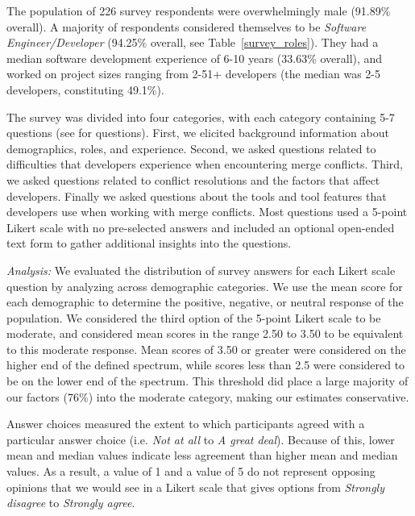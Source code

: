 The population of 226 survey respondents were overwhelmingly male (91.89\% overall). A majority of respondents considered themselves to be \textit{Software Engineer/Developer} (94.25\% overall, see Table~\ref{survey_roles}). They had a median software development experience of 6-10 years (33.63\% overall), and worked on project sizes ranging from 2-51+ developers (the median was 2-5 developers, constituting 49.1\%).

The survey was divided into four categories, with each category containing 5-7 questions (see \cite{companion_site} for questions).
First, we elicited background information about demographics, roles, and experience.
Second, we asked questions related to difficulties that developers experience when encountering merge conflicts.
Third, we asked questions related to conflict resolutions and the factors that affect developers.
Finally we asked questions about the tools and tool features that developers use when working with merge conflicts.
Most questions used a 5-point Likert scale with no pre-selected answers and included an optional open-ended text form to gather additional insights into the questions. 

\textit{Analysis:} We evaluated the distribution of survey answers for each Likert scale question by analyzing across demographic categories. 
We use the mean score for each demographic to determine the positive, negative, or neutral response of the population. 
We considered the third option of the 5-point Likert scale to be moderate, and considered mean scores in the range 2.50 to 3.50 to be equivalent to this moderate response. Mean scores of 3.50 or greater were considered on the higher end of the defined spectrum, while scores less than 2.5 were considered to be on the lower end of the spectrum. This threshold did place a large majority of our factors (76\%) into the moderate category, making our estimates conservative.

Answer choices measured the extent to which participants agreed with a particular answer choice (i.e. \textit{Not at all} to \textit{A great deal}). Because of this, lower mean and median values indicate less agreement than higher mean and median values. As a result, a value of 1 and a value of 5 do not represent opposing opinions that we would see in a Likert scale that gives options from \textit{Strongly disagree} to \textit{Strongly agree}.